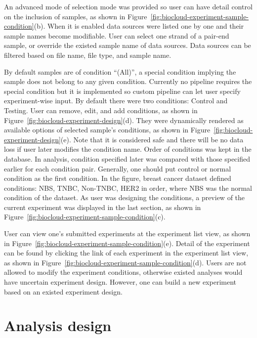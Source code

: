 An advanced mode of selection mode was provided so user can have detail control
on the inclusion of samples, as shown in
Figure~\ref{fig:biocloud-experiment-sample-condition}(b). When it is enabled
data sources were listed one by one and their sample names become modifiable.
User can select one strand of a pair-end sample, or override the existed sample
name of data sources. Data sources can be filtered based on file name, file
type, and sample name.

By default samples are of condition ``(All)'', a special condition implying the
sample does not belong to any given condition. Currently no pipeline requires
the special condition but it is implemented so custom pipeline can let user
specify experiment-wise input. By default there were two conditions: Control
and Testing. User can remove, edit, and add conditions, as shown in
Figure~\ref{fig:biocloud-experiment-design}(d). They were dynamically rendered
as available options of selected sample's conditions, as shown in
Figure~\ref{fig:biocloud-experiment-design}(e). Note that it is considered safe
and there will be no data loss if user later modifies the condition name.
Order of conditions was kept in the database. In analysis, condition specified
later was compared with those specified earlier for each condition pair.
Generally, one should put control or normal condition as the first condition.
In the figure, breast cancer dataset defined conditions: NBS, TNBC, Non-TNBC,
HER2 in order, where NBS was the normal condition of the dataset. As user was
designing the conditions, a preview of the current experiment was displayed in
the last section, as shown in
Figure~\ref{fig:biocloud-experiment-sample-condition}(c).

User can view one's submitted experiments at the experiment list view, as shown
in Figure~\ref{fig:biocloud-experiment-sample-condition}(e). Detail of the
experiment can be found by clicking the link of each experiment in the
experiment list view, as shown in
Figure~\ref{fig:biocloud-experiment-sample-condition}(d). Users are not allowed
to modify the experiment conditions, otherwise existed analyses would have
uncertain experiment design. However, one can build a new experiment based on
an existed experiment design.



\section{Analysis design}

